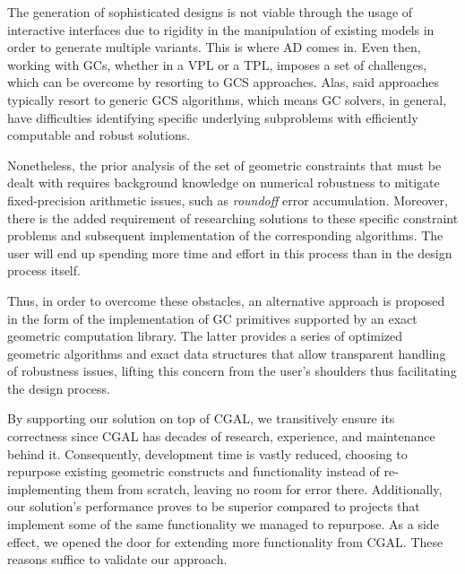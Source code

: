 %
\label{chap:conclusion}
\cleardoublepage{}

\noindent The generation of sophisticated designs is not viable through the
usage of interactive interfaces due to rigidity in the manipulation of existing
models in order to generate multiple variants.  This is where \ac{AD} comes in.
Even then, working with \acp{GC}, whether in a \ac{VPL} or a \ac{TPL}, imposes a
set of challenges, which can be overcome by resorting to \ac{GCS} approaches.
Alas, said approaches typically resort to generic \acs{GCS} algorithms, which
means \ac{GC} solvers, in general, have difficulties identifying specific
underlying subproblems with efficiently computable and robust solutions.

Nonetheless, the prior analysis of the set of geometric constraints that must be
dealt with requires background knowledge on numerical robustness to
mitigate fixed-precision arithmetic issues, such as \textit{roundoff} error
accumulation.  Moreover, there is the added requirement of researching solutions
to these specific constraint problems and subsequent implementation of the
corresponding algorithms.  The user will end up spending more time and effort in
this process than in the design process itself.

Thus, in order to overcome these obstacles, an alternative approach is proposed
in the form of the implementation of \ac{GC} primitives supported by an exact
geometric computation library.  The latter provides a series of optimized
geometric algorithms and exact data structures that allow transparent handling
of robustness issues, lifting this concern from the user's shoulders thus
facilitating the design process.

By supporting our solution on top of \ac{CGAL}, we transitively ensure its
correctness since \ac{CGAL} has decades of research, experience, and maintenance
behind it.  Consequently, development time is vastly reduced, choosing to
repurpose existing geometric constructs and functionality instead of
re-implementing them from scratch, leaving no room for error there.
Additionally, our solution's performance proves to be superior compared to
projects that implement some of the same functionality we managed to repurpose.
As a side effect, we opened the door for extending more functionality from
\ac{CGAL}.  These reasons suffice to validate our approach.

